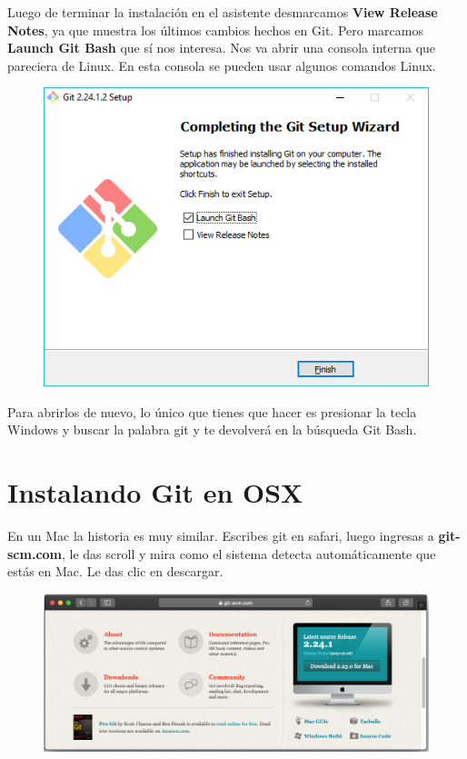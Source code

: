 \documentclass{article}
\begin{document}
Luego de terminar la instalación en el asistente desmarcamos \textbf{View
Release Notes}, ya que muestra los últimos cambios hechos en Git. Pero marcamos
\textbf{Launch Git Bash} que sí nos interesa. Nos va abrir una consola interna
que pareciera de Linux. En esta consola se pueden usar algunos comandos
Linux.\\

\begin{figure}[h!]
  \centering
  \includegraphics[scale=0.65]{./Pictures/023_install_git.png}
\end{figure}

Para abrirlos de nuevo, lo único que tienes que hacer es presionar la tecla
Windows y buscar la palabra git y te devolverá en la búsqueda Git Bash.

\newpage

\section{Instalando Git en OSX}%
En un Mac la historia es muy similar. Escribes git en safari, luego ingresas a
\textbf{git-scm.com}, le das scroll y mira como el sistema detecta
automáticamente que estás en Mac. Le das clic en descargar.

\begin{figure}[h!]
  \centering
  \includegraphics[scale=0.5]{./Pictures/022_mac_git.png}
\end{figure}
\end{document}
